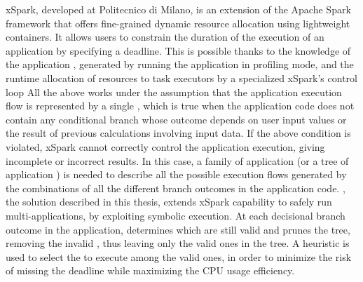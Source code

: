 xSpark, developed at Politecnico di Milano, is an extension of the Apache Spark framework that offers fine-grained dynamic resource allocation using lightweight containers. It allows users to constrain the duration of the execution of an application by specifying a deadline. This is possible thanks to the knowledge of the application \plan, generated by running the application in profiling mode, and the runtime allocation of resources to task executors by a specialized xSpark’s control loop%
All the above works under the assumption that the application execution flow is represented by a single \plan, which is true when the application code does not contain any conditional branch whose outcome depends on user input values or the result of previous calculations involving input data. %
If the above condition is violated, xSpark cannot correctly control the application execution, giving incomplete or incorrect results. 
In this case, a family of application \plans (or a tree of application \plans) is needed to describe all the possible execution flows generated by the combinations of all the different branch outcomes in the application code. 
\tool, the solution described in this thesis, extends xSpark capability to safely run multi-\plan applications, by exploiting symbolic execution. At each decisional branch outcome in the application, \tool determines which \plans are still valid and prunes the \plans tree, removing the invalid \plans, thus leaving only the valid ones in the \plans tree. A heuristic is used to select the \plan to execute among the valid ones, in order to minimize the risk of missing the deadline while maximizing the CPU usage efficiency.
